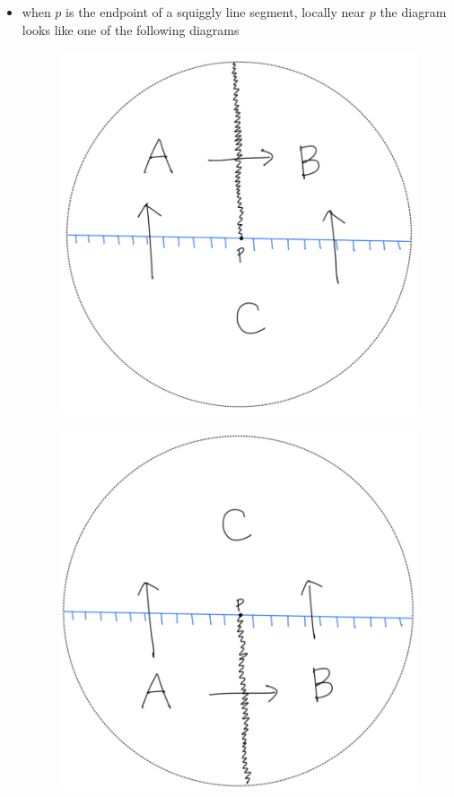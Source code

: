 \begin{itemize}
\begin{itemize}
\item when $p$ is the endpoint of a squiggly line segment, locally near $p$ the diagram looks like one of the following diagrams 
\begin{figure}[H] 
    \centering
    \includegraphics[scale = 0.55]{diagrams/intro/4.png}
    \caption{}
    \label{fig:your-label}
\end{figure}
\begin{figure}[H] 
    \centering
    \includegraphics[scale = 0.55]{diagrams/intro/5.png}

\end{figure}
\end{itemize}
\end{itemize}
